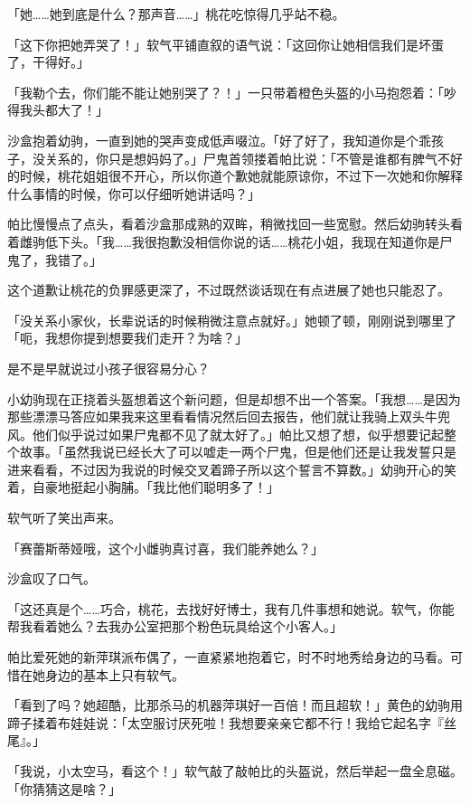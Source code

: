 「她……她到底是什么？那声音……」桃花吃惊得几乎站不稳。

「这下你把她弄哭了！」软气平铺直叙的语气说：「这回你让她相信我们是坏蛋了，干得好。」

「我勒个去，你们能不能让她别哭了？！」一只带着橙色头盔的小马抱怨着：「吵得我头都大了！」

沙盒抱着幼驹，一直到她的哭声变成低声啜泣。「好了好了，我知道你是个乖孩子，没关系的，你只是想妈妈了。」尸鬼首领搂着帕比说：「不管是谁都有脾气不好的时候，桃花姐姐很不开心，所以你道个歉她就能原谅你，不过下一次她和你解释什么事情的时候，你可以仔细听她讲话吗？」

帕比慢慢点了点头，看着沙盒那成熟的双眸，稍微找回一些宽慰。然后幼驹转头看着雌驹低下头。「我……我很抱歉没相信你说的话……桃花小姐，我现在知道你是尸鬼了，我错了。」

这个道歉让桃花的负罪感更深了，不过既然谈话现在有点进展了她也只能忍了。

「没关系小家伙，长辈说话的时候稍微注意点就好。」她顿了顿，刚刚说到哪里了「呃，我想你提到想要我们走开？为啥？」

是不是早就说过小孩子很容易分心？

小幼驹现在正挠着头盔想着这个新问题，但是却想不出一个答案。「我想……是因为那些漂漂马答应如果我来这里看看情况然后回去报告，他们就让我骑上双头牛兜风。他们似乎说过如果尸鬼都不见了就太好了。」帕比又想了想，似乎想要记起整个故事。「虽然我说已经长大了可以嘘走一两个尸鬼，但是他们还是让我发誓只是进来看看，不过因为我说的时候交叉着蹄子所以这个誓言不算数。」幼驹开心的笑着，自豪地挺起小胸脯。「我比他们聪明多了！」

软气听了笑出声来。

「赛蕾斯蒂娅哦，这个小雌驹真讨喜，我们能养她么？」

沙盒叹了口气。

「这还真是个……巧合，桃花，去找好好博士，我有几件事想和她说。软气，你能帮我看着她么？去我办公室把那个粉色玩具给这个小客人。」

\horizonline


帕比爱死她的新萍琪派布偶了，一直紧紧地抱着它，时不时地秀给身边的马看。可惜在她身边的基本上只有软气。

「看到了吗？她超酷，比那杀马的机器萍琪好一百倍！而且超软！」黄色的幼驹用蹄子揉着布娃娃说：「太空服讨厌死啦！我想要亲亲它都不行！我给它起名字『丝尾』。」

「我说，小太空马，看这个！」软气敲了敲帕比的头盔说，然后举起一盘全息磁。「你猜猜这是啥？」

